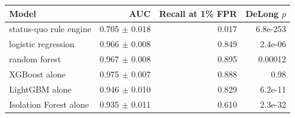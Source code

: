 \begin{tabular}{lrrr}
\toprule
Model & AUC & Recall at 1\% FPR & DeLong $p$ \\
\midrule
status-quo rule engine & 0.705 $\pm$ 0.018 & 0.017 & 6.8e-253 \\
logistic regression & 0.966 $\pm$ 0.008 & 0.849 & 2.4e-06 \\
random forest & 0.967 $\pm$ 0.008 & 0.895 & 0.00012 \\
XGBoost alone & 0.975 $\pm$ 0.007 & 0.888 & 0.98 \\
LightGBM alone & 0.946 $\pm$ 0.010 & 0.829 & 6.2e-11 \\
Isolation Forest alone & 0.935 $\pm$ 0.011 & 0.610 & 2.3e-32 \\
\bottomrule
\end{tabular}
